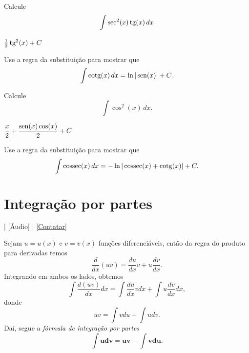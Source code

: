 \begin{exer}
  Calcule
  \begin{equation}
    \int\sec^2(x)\operatorname{tg}(x)\,dx
  \end{equation}
\end{exer}
\begin{resp}
  $\frac{1}{2}\operatorname{tg}^2(x) + C$
\end{resp}

\begin{exer}\label{exer:int_subs_cotg}
  Use a regra da substituição para mostrar que
  \begin{equation}
    \int \operatorname{cotg}(x)\,dx = \ln|\operatorname{sen}(x)| + C.
  \end{equation}
\end{exer}

\begin{exer}
  Calcule
  \begin{equation}
    \int \cos^2(x)\,dx.
  \end{equation}
\end{exer}
\begin{resp}
  $\displaystyle \frac{x}{2} + \frac{\operatorname{sen}(x)\cos(x)}{2} + C$
\end{resp}

\begin{exer}\label{exer:int_subs_cossec}
  Use a regra da substituição para mostrar que
  \begin{equation}
    \int \operatorname{cossec}(x)\,dx = -\ln|\operatorname{cossec}(x)+\operatorname{cotg}(x)| + C.
  \end{equation}
\end{exer}


\section{Integração por partes}\label{cap_int_sec_partes}

\begin{flushright}
  [Vídeo] | [Áudio] | \href{https://phkonzen.github.io/notas/contato.html}{[Contatar]}
\end{flushright}

Sejam $u=u(x)$ e $v=v(x)$ funções diferenciáveis, então da regra do produto para derivadas temos
\begin{equation}
  \frac{d}{dx}(uv) = \frac{du}{dx}v + u\frac{dv}{dx}.
\end{equation}
Integrando em ambos os lados, obtemos
\begin{equation}
  \int \frac{d (uv)}{dx}dx = \int \frac{du}{dx}vdx + \int u\frac{dv}{dx}dx,
\end{equation}
donde
\begin{equation}
  uv = \int vdu + \int udv.
\end{equation}
Daí, segue a \emph{fórmula de integração por partes}
\begin{equation}
  \pmb{\int udv = uv - \int vdu}.
\end{equation}

